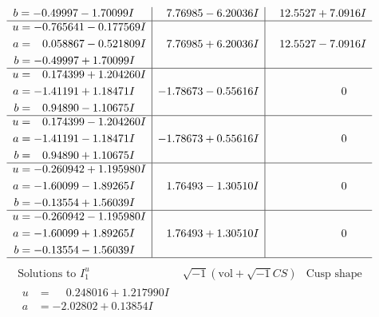 \documentclass[1p]{elsarticle_modified}
\theoremstyle{definition}
\newcommand{\I}{\sqrt{-1}}
\begin{document}
$$\begin{array}{c|c|c}
\begin{aligned}
b &= -0.49997 - 1.70099 I\end{aligned}
 & \phantom{-}7.76985 - 6.20036 I & \phantom{-}12.5527 + 7.0916 I \\ \hline\begin{aligned}
u &= -0.765641 - 0.177569 I \\
a &= \phantom{-}0.058867 - 0.521809 I \\
b &= -0.49997 + 1.70099 I\end{aligned}
 & \phantom{-}7.76985 + 6.20036 I & \phantom{-}12.5527 - 7.0916 I \\ \hline\begin{aligned}
u &= \phantom{-}0.174399 + 1.204260 I \\
a &= -1.41191 + 1.18471 I \\
b &= \phantom{-}0.94890 - 1.10675 I\end{aligned}
 & -1.78673 - 0.55616 I & \phantom{-0.000000 } 0 \\ \hline\begin{aligned}
u &= \phantom{-}0.174399 - 1.204260 I \\
a &= -1.41191 - 1.18471 I \\
b &= \phantom{-}0.94890 + 1.10675 I\end{aligned}
 & -1.78673 + 0.55616 I & \phantom{-0.000000 } 0 \\ \hline\begin{aligned}
u &= -0.260942 + 1.195980 I \\
a &= -1.60099 - 1.89265 I \\
b &= -0.13554 + 1.56039 I\end{aligned}
 & \phantom{-}1.76493 - 1.30510 I & \phantom{-0.000000 } 0 \\ \hline\begin{aligned}
u &= -0.260942 - 1.195980 I \\
a &= -1.60099 + 1.89265 I \\
b &= -0.13554 - 1.56039 I\end{aligned}
 & \phantom{-}1.76493 + 1.30510 I & \phantom{-0.000000 } 0\\
 \hline 
 \end{array}$$\newpage$$\begin{array}{c|c|c}  
\text{Solutions to }I^u_{1}& \I (\text{vol} + \sqrt{-1}CS) & \text{Cusp shape}\\
 \hline 
\begin{aligned}
u &= \phantom{-}0.248016 + 1.217990 I \\
a &= -2.02802 + 0.13854 I \\

\end{aligned}
\end{array}$$
\end{document}
